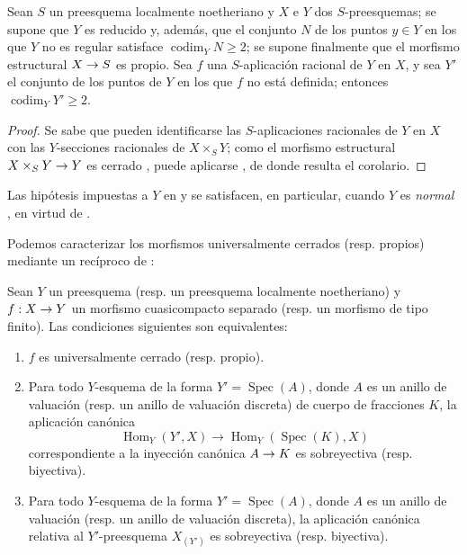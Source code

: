 \documentclass[oneside,10pt]{amsart}
\makeatletter
\renewcommand{\geq}{\geqslant}
\newcommand{\ega@arrow}[2]{\mathchoice{#1}{#2}{#2}{#2}}
\renewcommand{\to}{\ega@arrow{\longrightarrow}{\rightarrow}}
\newcommand{\oldpage}[2][]{\marginnote{\normalfont\footnotesize\textbf{#1}~|~#2}\ignorespaces}
\let\EGAOriginalLabel\label
\renewcommand{\label}[1]{\phantomsection\EGAOriginalLabel{#1}}
\makeatother
\begin{document}
\begin{corollary}[7.3.6]
\label{II.7.3.6-fr}
Sean $S$ un preesquema localmente noetheriano y $X$ e $Y$ dos $S$-preesquemas;
se supone que $Y$ es reducido y, además, que el conjunto $N$ de los puntos $y\in Y$ en los que $Y$ no es regular satisface $\operatorname{codim}_YN\geq2$;
se supone finalmente que el morfismo estructural $X\to S$ es propio.
Sea $f$ una $S$-aplicación racional de $Y$ en $X$, y sea $Y'$ el conjunto de los puntos de $Y$ en los que $f$ no está definida;
entonces $\operatorname{codim}_YY'\geq2$.
\end{corollary}

\begin{proof}
Se sabe  que pueden identificarse las $S$-aplicaciones racionales de $Y$ en $X$ con las $Y$-secciones racionales de $X\times_SY$;
como el morfismo estructural $X\times_SY\to Y$ es cerrado , puede aplicarse , de donde resulta el corolario.
\end{proof}

\begin{remark}[7.3.7]
\label{II.7.3.7-fr}
Las hipótesis impuestas a $Y$ en  y  se satisfacen, en particular, cuando $Y$ es \emph{normal} , en virtud de .
\end{remark}


Podemos caracterizar los morfismos universalmente cerrados (resp. propios) mediante un recíproco de :

\begin{theorem}[7.3.8]
\label{II.7.3.8-fr}
Sean $Y$ un preesquema \textup{(resp.} un preesquema localmente noetheriano\textup{)} y $f:X\to Y$ un morfismo cuasicompacto separado \textup{(resp.} un morfismo de tipo finito\textup{)}.
Las condiciones siguientes son equivalentes:
\begin{enumerate}
  \item[\rm{(a)}] $f$ es universalmente cerrado \textup{(resp.} propio\textup{)}.
  \item[\rm{(b)}] Para todo $Y$-esquema de la forma $Y'=\operatorname{Spec}(A)$, donde $A$ es un anillo de valuación \textup{(resp.} un anillo de valuación discreta) de cuerpo de fracciones $K$, la aplicación canónica
  \[
\operatorname{Hom}_Y(Y',X)\longrightarrow
\operatorname{Hom}_Y(\operatorname{Spec}(K),X)
\]
  correspondiente a la inyección canónica $A\to K$ es sobreyectiva \textup{(resp.} biyectiva\textup{)}.
\oldpage[II]{145}
  \item[\rm{(c)}] Para todo $Y$-esquema de la forma $Y'=\operatorname{Spec}(A)$, donde $A$ es un anillo de valuación \textup{(resp.} un anillo de valuación discreta), la aplicación canónica \textup{} relativa al $Y'$-preesquema $X_{(Y')}$ es sobreyectiva \textup{(resp.} biyectiva).
\end{enumerate}
\end{theorem}
\end{document}
